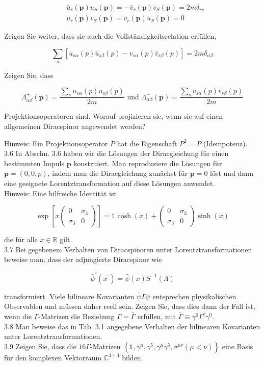 \documentclass[10pt, letterpaper]{article}
\begin{document}
$$
\begin{aligned}
& \bar{u}_{r}(\mathbf{p}) u_{S}(\mathbf{p})=-\bar{v}_{r}(\mathbf{p}) v_{S}(\mathbf{p})=2 m \delta_{r s} \\
& \bar{u}_{r}(\mathbf{p}) v_{S}(\mathbf{p})=\bar{v}_{r}(\mathbf{p}) u_{S}(\mathbf{p})=0
\end{aligned}
$$

Zeigen Sie weiter, dass sie auch die Vollständigkeitsrelation erfüllen,

$$
\sum_{s}\left[u_{s \alpha}(p) \bar{u}_{s \beta}(p)-v_{s \alpha}(p) \bar{v}_{s \beta}(p)\right]=2 m \delta_{\alpha \beta}
$$

Zeigen Sie, dass

$$
\Lambda_{\alpha \beta}^{+}(\mathbf{p})=\frac{\sum_{s} u_{s \alpha}(p) \bar{u}_{s \beta}(p)}{2 m} \text { und } \Lambda_{\alpha \beta}^{-}(\mathbf{p})=\frac{\sum_{s} v_{s \alpha}(p) \bar{v}_{s \beta}(p)}{2 m}
$$

Projektionsoperatoren sind. Worauf projizieren sie, wenn sie auf einen allgemeinen Diracspinor angewendet werden?

Hinweis: Ein Projektionsoperator $P$ hat die Eigenschaft $P^{2}=P$ (Idempotenz).\\
3.6 In Abschn. 3.6 haben wir die Lösungen der Diracgleichung für einen bestimmten Impuls $\mathbf{p}$ konstruiert. Man reproduziere die Lösungen für $\mathbf{p}=(0,0, p)$, indem man die Diracgleichung zunächst für $\mathbf{p}=0$ löst und dann eine geeignete Lorentztransformation auf diese Lösungen anwendet.\\
Hinweis: Eine hilfreiche Identität ist

$$
\exp \left[x\left(\begin{array}{cc}
0 & \sigma_{3} \\
\sigma_{3} & 0
\end{array}\right)\right]=\mathbb{1} \cosh (x)+\left(\begin{array}{cc}
0 & \sigma_{3} \\
\sigma_{3} & 0
\end{array}\right) \sinh (x)
$$

die für alle $x \in \mathbb{R}$ gilt.\\
3.7 Bei gegebenem Verhalten von Diracspinoren unter Lorentztransformationen beweise man, dass der adjungierte Diracspinor wie

$$
\bar{\psi}^{\prime}\left(x^{\prime}\right)=\bar{\psi}(x) S^{-1}(\Lambda)
$$

transformiert. Viele bilineare Kovarianten $\bar{\psi} \Gamma \psi$ entsprechen physikalischen Observablen und müssen daher reell sein. Zeigen Sie, dass dies dann der Fall ist, wenn die $\Gamma$-Matrizen die Beziehung $\Gamma=\bar{\Gamma}$ erfüllen, mit $\bar{\Gamma} \equiv \gamma^{0} \Gamma^{\dagger} \gamma^{0}$.\\
3.8 Man beweise das in Tab. 3.1 angegebene Verhalten der bilinearen Kovarianten unter Lorentztransformationen.\\
3.9 Zeigen Sie, dass die $16 \Gamma$-Matrizen $\left\{\mathbb{1}, \gamma^{\mu}, \gamma^{5}, \gamma^{\mu} \gamma^{5}, \sigma^{\mu \nu}(\mu<\nu)\right\}$ eine Basis für den komplexen Vektorraum $\mathbb{C}^{4 \times 4}$ bilden.
\end{document}
